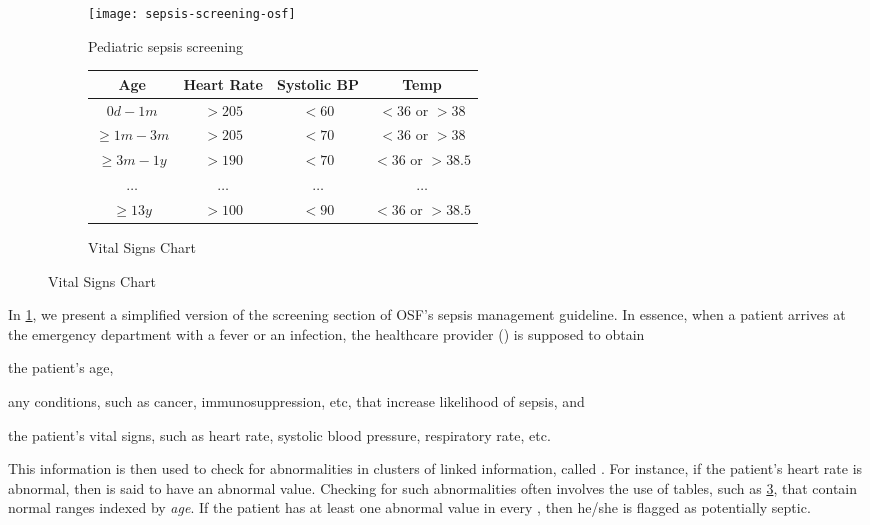 \begin{figure}[b]
  \begin{subfigure}[b]{0.5\textwidth}
    \texttt{[image: sepsis-screening-osf]}
    \caption{Pediatric sepsis screening \BPG{}}\label{fig:sepsis-screening}
  \end{subfigure}
  \begin{subfigure}[b]{0.3\textwidth}
    \tiny
      \begin{tabular}{ | c || c | c | c | }
        \hline
        \textbf{Age}            & \textbf{Heart Rate}   & \textbf{Systolic BP} & \textbf{Temp}  \\
        \hline
        $0d - 1m$               & $>205$                & $<60$                & $<36 \text{ or } >38$ \\
        \hline
        $\geq 1m - 3m$          & $>205$                & $<70$                & $<36 \text{ or } >38$ \\
        \hline
        $\geq 3m - 1y$          & $>190$                & $<70$                & $<36 \text{ or } >38.5$ \\
        \hline
        $\dots$                 & $\dots$               & $\dots$              & $\dots$ \\
        \hline
        $\geq 13y$              & $>100$                & $<90$                & $<36 \text{ or } >38.5$ \\
        \hline
      \end{tabular}
      \caption{Vital Signs Chart}\label{table:vital-signs}
  \end{subfigure}
\end{figure}

In \figurename{} \ref{fig:sepsis-screening}, we present a simplified version of
the screening section of OSF's sepsis management guideline.
In essence, when a patient arrives at the emergency department
\ED{} with a fever or an infection, the healthcare provider (\HCP{}) is supposed to obtain
\begin{enumerate*}[label=(\alph*)]
  \item the patient's age,
  \item any conditions, such as cancer, immunosuppression, etc,
    that increase likelihood of sepsis, and
  \item the patient's vital signs, such as heart rate, systolic blood
    pressure, respiratory rate, etc.
\end{enumerate*}
This information is then used to check for abnormalities
in clusters of linked information, called . For instance, if
the patient's heart rate is abnormal, then  is said to
have an abnormal value.
Checking for such abnormalities often involves the use of tables, such as
\tablename{} \ref{table:vital-signs}, that contain normal ranges indexed by
\emph{age}.
If the patient has at least one abnormal value in every ,
then he/she is flagged as potentially septic.

